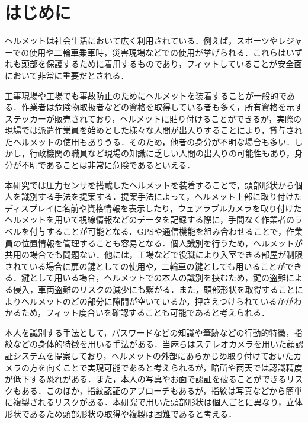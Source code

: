 \documentclass[Japanese,noauthor]{dicomopapers}
\begin{document}
\maketitle

\section{はじめに}
\label{introduction}
ヘルメットは社会生活において広く利用されている．例えば，スポーツやレジャーでの使用や二輪車乗車時，災害現場などでの使用が挙げられる．これらはいずれも頭部を保護するために着用\cite{helmet}するものであり，フィットしていることが安全面において非常に重要だとされる．\par

工事現場や工場でも事故防止のためにヘルメットを装着することが一般的である．作業者は危険物取扱者などの資格を取得している者も多く，所有資格を示すステッカーが販売されており，ヘルメットに貼り付けることができるが，実際の現場では派遣作業員を始めとした様々な人間が出入りすることにより，貸与されたヘルメットの使用もありうる．そのため，他者の身分が不明な場合も多い．しかし，行政機関の職員など現場の知識に乏しい人間の出入りの可能性もあり，身分が不明であることは非常に危険であるといえる．\par

本研究では圧力センサを搭載したヘルメットを装着することで，頭部形状から個人を識別する手法を提案する．提案手法によって，ヘルメット上部に取り付けたディスプレイに名前や資格情報を表示したり，ウェアラブルカメラを取り付けたヘルメットを用いて視線情報などのデータを記録する際に，手間なく作業者のラベルを付与することが可能となる．GPSや通信機能\cite{disaster}を組み合わせることで，作業員の位置情報を管理することも容易となる．個人識別を行うため，ヘルメットが共用の場合でも問題ない．他には，工場などで役職により入室できる部屋が制限されている場合に扉の鍵としての使用や，二輪車の鍵としても用いることができる．鍵として用いる場合，ヘルメットでの本人の識別を挟むため，鍵の盗難による侵入，車両盗難のリスクの減少にも繋がる．また，頭部形状を取得することによりヘルメットのどの部分に隙間が空いているか，押さえつけられているかがわかるため，フィット度合いを確認することも可能であると考えられる．\par

本人を識別する手法として，パスワードなどの知識や筆跡などの行動的特徴，指紋などの身体的特徴を用いる手法がある．当麻ら\cite{face}はステレオカメラを用いた顔認証システムを提案しており，ヘルメットの外部にあらかじめ取り付けておいたカメラの方を向くことで実現可能であると考えられるが，暗所や雨天では認識精度が低下する恐れがある．また，本人の写真やお面で認証を破ることができるリスクもある．このほか，指紋認証のアプローチもあるが，指紋は写真などから簡単に複製されるリスク\cite{finger_print}がある．本研究で用いた頭部形状は個人ごとに異なり，立体形状であるため頭部形状の取得や複製は困難であると考える．\par
\end{document}
